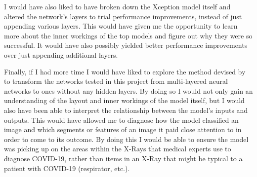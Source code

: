 I would have also liked to have broken down the Xception model itself and altered the network's layers to trial performance improvements, instead of just appending various layers. This would have given me the opportunity to learn more about the inner workings of the top models and figure out why they were so successful. It would have also possibly yielded better performance improvements over just appending additional layers.

Finally, if I had more time I would have liked to explore the method devised by \cite{kamimura2019neural} to transform the networks tested in this project from multi-layered neural networks to ones without any hidden layers. By doing so I would not only gain an understanding of the layout and inner workings of the model itself, but I would also have been able to interpret the relationship between the model's inputs and outputs. This would have allowed me to diagnose how the model classified an image and which segments or features of an image it paid close attention to in order to come to its outcome. By doing this I would be able to ensure the model was picking up on the areas within the X-Rays that medical experts use to diagnose COVID-19, rather than items in an X-Ray that might be typical to a patient with COVID-19 (respirator, etc.).